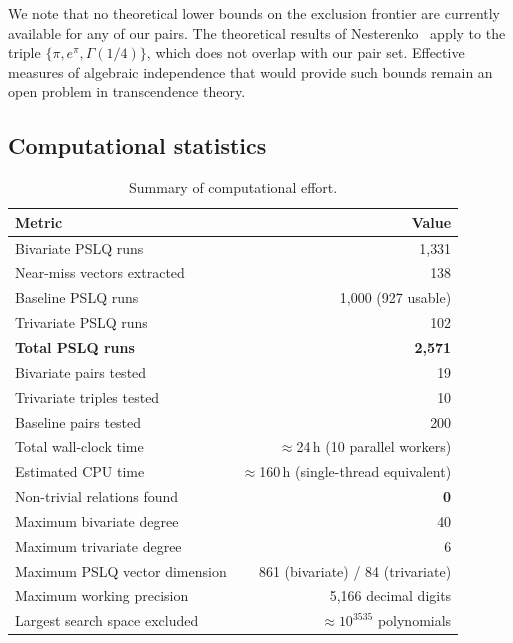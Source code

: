 \documentclass[11pt]{amsart}
\theoremstyle{remark}
\begin{document}
We note that no theoretical lower bounds on the exclusion frontier are
currently available for any of our pairs. The theoretical results of
Nesterenko~\cite{Nesterenko1996} apply to the triple
$\{\pi, e^\pi, \Gamma(1/4)\}$, which does not overlap with our pair set.
Effective measures of algebraic independence that would provide such bounds
remain an open problem in transcendence theory.

\subsection{Computational statistics}\label{ssec:stats}

\begin{table}[ht]
\centering
\caption{Summary of computational effort.}\label{tab:stats}
\begin{tabular}{@{}lr@{}}
\toprule
Metric & Value \\
\midrule
Bivariate PSLQ runs          & 1{,}331 \\
Near-miss vectors extracted   & 138 \\
Baseline PSLQ runs            & 1{,}000 (927 usable)\footnotemark{} \\
Trivariate PSLQ runs          & 102 \\
\textbf{Total PSLQ runs}     & \textbf{2{,}571} \\
Bivariate pairs tested        & 19 \\
Trivariate triples tested     & 10 \\
Baseline pairs tested         & 200 \\
Total wall-clock time         & $\approx$24\,h (10 parallel workers) \\
Estimated CPU time            & $\approx$160\,h (single-thread equivalent) \\
Non-trivial relations found   & \textbf{0} \\
Maximum bivariate degree      & 40 \\
Maximum trivariate degree     & 6 \\
Maximum PSLQ vector dimension & 861 (bivariate) / 84 (trivariate) \\
Maximum working precision     & 5{,}166 decimal digits \\
Largest search space excluded & $\approx 10^{3535}$ polynomials \\
\bottomrule
\end{tabular}
\end{table}
\end{document}
